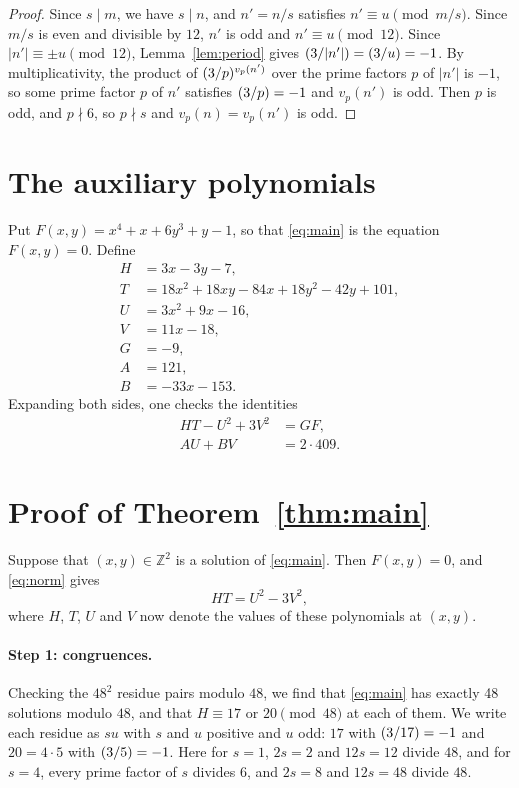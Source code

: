 \documentclass[11pt]{article}
\newcommand{\Z}{\mathbb{Z}}
\newcommand{\leg}[2]{\mathchoice{\biggl(\dfrac{#1}{#2}\biggr)}{(#1/#2)}{(#1/#2)}{(#1/#2)}}
\begin{document}
\begin{proof}
Since $s\mid m$, we have $s\mid n$, and $n'=n/s$ satisfies $n'\equiv u\pmod{m/s}$. Since $m/s$ is even and divisible by $12$, $n'$ is odd and $n'\equiv u\pmod{12}$. Since $|n'|\equiv\pm u\pmod{12}$, Lemma~\ref{lem:period} gives $\leg{3}{|n'|}=\leg{3}{u}=-1$. By multiplicativity, the product of $\leg{3}{p}^{v_p(n')}$ over the prime factors $p$ of $|n'|$ is $-1$, so some prime factor $p$ of $n'$ satisfies $\leg{3}{p}=-1$ and $v_p(n')$ is odd. Then $p$ is odd, and $p\nmid6$, so $p\nmid s$ and $v_p(n)=v_p(n')$ is odd.
\end{proof}

\section{The auxiliary polynomials}

Put $F(x,y)=x^{4}+x+6y^{3}+y-1$, so that \eqref{eq:main} is the equation $F(x,y)=0$. Define
\begin{align*}
H&=3x-3y-7,\\
T&=18x^{2}+18xy-84x+18y^{2}-42y+101,\\
U&=3x^{2}+9x-16,\\
V&=11x-18,\\
G&=-9,\\
A&=121,\\
B&=-33x-153.
\end{align*}
Expanding both sides, one checks the identities
\begin{align}
HT-U^2+3V^2&=GF,\label{eq:norm}\\
AU+BV&=2\cdot 409.\label{eq:bezout}
\end{align}

\section{Proof of Theorem~\ref{thm:main}}

Suppose that $(x,y)\in\Z^2$ is a solution of \eqref{eq:main}. Then $F(x,y)=0$, and \eqref{eq:norm} gives
\begin{equation}\label{eq:HT}
HT=U^2-3V^2,
\end{equation}
where $H$, $T$, $U$ and $V$ now denote the values of these polynomials at $(x,y)$.

\paragraph{Step 1: congruences.} Checking the $48^2$ residue pairs modulo $48$, we find that \eqref{eq:main} has exactly 48 solutions modulo $48$, and that $H\equiv17\text{ or }20\pmod{48}$ at each of them. We write each residue as $su$ with $s$ and $u$ positive and $u$ odd: $17$ with $\leg{3}{17}=-1$ and $20=4\cdot5$ with $\leg{3}{5}=-1$. Here for $s=1$, $2s=2$ and $12s=12$ divide $48$, and for $s=4$, every prime factor of $s$ divides $6$, and $2s=8$ and $12s=48$ divide $48$.
\end{document}
